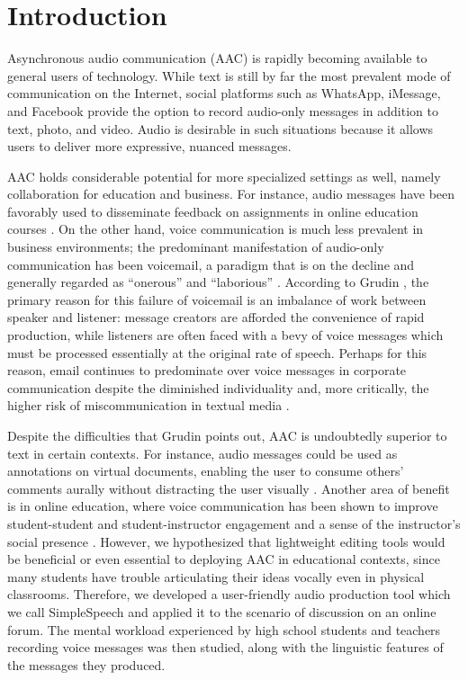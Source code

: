 \section{Introduction}

Asynchronous audio communication (AAC) is rapidly becoming available to general users of technology. 
While text is still by far the most prevalent mode of communication on the Internet, social platforms such as WhatsApp, iMessage, and Facebook provide the option to record audio-only messages in addition to text, photo, and video. 
Audio is desirable in such situations because it allows users to deliver more expressive, nuanced messages.

AAC holds considerable potential for more specialized settings as well, namely collaboration for education and business. 
For instance, audio messages have been favorably used to disseminate feedback on assignments in online education courses \cite{ice,oomen}. 
On the other hand, voice communication is much less prevalent in business environments; the predominant manifestation of audio-only communication has been voicemail, a paradigm that is on the decline and generally regarded as ``onerous'' and ``laborious'' \cite{whittaker}. 
According to Grudin \cite{grudin}, the primary reason for this failure of voicemail is an imbalance of work between speaker and listener: message creators are afforded the convenience of rapid production, while listeners are often faced with a bevy of voice messages which must be processed essentially at the original rate of speech. 
Perhaps for this reason, email continues to predominate over voice messages in corporate communication despite the diminished individuality and, more critically, the higher risk of miscommunication in textual media \cite{byron}.

Despite the difficulties that Grudin points out, AAC is undoubtedly superior to text in certain contexts. 
For instance, audio messages could be used as annotations on virtual documents, enabling the user to consume others' comments aurally without distracting the user visually \cite{yoon}.
Another area of benefit is in online education, where voice communication has been shown to improve student-student and student-instructor engagement and a sense of the instructor's social presence \cite{oomen,tu}. 
However, we hypothesized that lightweight editing tools would be beneficial or even essential to deploying AAC in educational contexts, since many students have trouble articulating their ideas vocally even in physical classrooms.
Therefore, we developed a user-friendly audio production tool which we call SimpleSpeech and applied it to the scenario of discussion on an online forum. 
The mental workload experienced by high school students and teachers recording voice messages was then studied, along with the linguistic features of the messages they produced.

